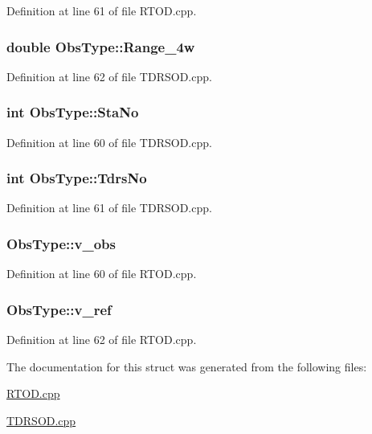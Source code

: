 Definition at line 61 of file R\-T\-O\-D.\-cpp.

\hypertarget{structObsType_ac6117b66417dd51195f5319b00667df8}{
\subsubsection[{Range\-\_\-4w}]{\setlength{\rightskip}{0pt plus 5cm}double Obs\-Type\-::\-Range\-\_\-4w}}\label{structObsType_ac6117b66417dd51195f5319b00667df8}


Definition at line 62 of file T\-D\-R\-S\-O\-D.\-cpp.

\hypertarget{structObsType_aa862468ded2618b8184946616cc55b74}{
\subsubsection[{Sta\-No}]{\setlength{\rightskip}{0pt plus 5cm}int Obs\-Type\-::\-Sta\-No}}\label{structObsType_aa862468ded2618b8184946616cc55b74}


Definition at line 60 of file T\-D\-R\-S\-O\-D.\-cpp.

\hypertarget{structObsType_aa2e173387732fca7bc9987a042a2c099}{
\subsubsection[{Tdrs\-No}]{\setlength{\rightskip}{0pt plus 5cm}int Obs\-Type\-::\-Tdrs\-No}}\label{structObsType_aa2e173387732fca7bc9987a042a2c099}


Definition at line 61 of file T\-D\-R\-S\-O\-D.\-cpp.

\hypertarget{structObsType_a78a3431694e3fb1f6aa93a4be3546252}{
\subsubsection[{v\-\_\-obs}]{ Obs\-Type\-::v\-\_\-obs}}\label{structObsType_a78a3431694e3fb1f6aa93a4be3546252}


Definition at line 60 of file R\-T\-O\-D.\-cpp.

\hypertarget{structObsType_a82704392ace0e555604f2cee287fa456}{
\subsubsection[{v\-\_\-ref}]{ Obs\-Type\-::v\-\_\-ref}}\label{structObsType_a82704392ace0e555604f2cee287fa456}


Definition at line 62 of file R\-T\-O\-D.\-cpp.



The documentation for this struct was generated from the following files\-:\begin{DoxyCompactItemize}
\item 
\hyperlink{RTOD_8cpp}{R\-T\-O\-D.\-cpp}\item 
\hyperlink{TDRSOD_8cpp}{T\-D\-R\-S\-O\-D.\-cpp}\end{DoxyCompactItemize}
